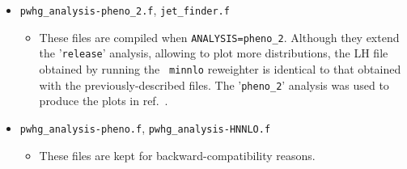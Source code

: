 \documentclass[11pt,a4paper]{article}
\begin{document}
\begin{itemize}
\item {{\tt pwhg\_analysis-pheno\_2.f}, {\tt jet\_finder.f}}
  \begin{itemize}
  \item These files are compiled when {\tt ANALYSIS=pheno\_2}.
    Although they extend the '{\tt release}' analysis, allowing to
    plot more distributions, the LH file obtained by running the {\tt
      minnlo} reweighter is identical to that obtained with the
    previously-described files. The '{\tt pheno\_2}' analysis was used
    to produce the plots in ref.~\cite{Hamilton:2013fea}.
  \end{itemize}
  
\item {{\tt pwhg\_analysis-pheno.f}, {\tt pwhg\_analysis-HNNLO.f}}
  \begin{itemize}
  \item These files are kept for backward-compatibility reasons.
  \end{itemize}
  
\end{itemize}



\end{document}
